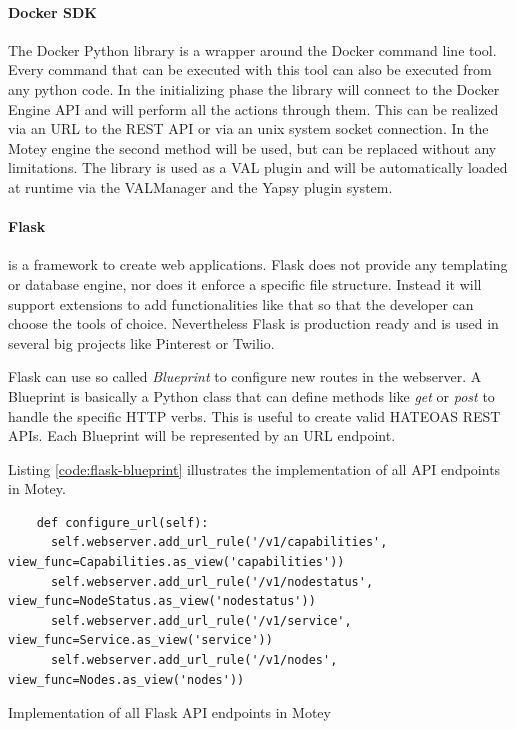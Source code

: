 \paragraph{Docker \ac{SDK}}
The Docker Python library is a wrapper around the Docker command line tool.
Every command that can be executed with this tool can also be executed from any python code.
In the initializing phase the library will connect to the Docker Engine \ac{API} and will perform all the actions through them.
This can be realized via an \ac{URL} to the \ac{REST} \ac{API} or via an unix system socket connection.
In the Motey engine the second method will be used, but can be replaced without any limitations.
The library is used as a \ac{VAL} plugin and will be automatically loaded at runtime via the VALManager and the Yapsy plugin system.

\paragraph{Flask} is a framework to create web applications.
Flask does not provide any templating or database engine, nor does it enforce a specific file structure.
Instead it will support extensions to add functionalities like that so that the developer can choose the tools of choice.\autocite[cf.]{Flask:Documentation:Foreword}
Nevertheless Flask is production ready and is used in several big projects like Pinterest\autocite{Quora:Pinterest:Flask} or Twilio\autocite{Twilio:Flask}.

Flask can use so called \textit{Blueprint} to configure new routes in the webserver.
A Blueprint is basically a Python class that can define methods like \textit{get} or \textit{post} to handle the specific \ac{HTTP} verbs.
This is useful to create valid \ac{HATEOAS} \ac{REST} \acp{API}.
Each Blueprint will be represented by an \ac{URL} endpoint.

Listing \ref{code:flask-blueprint} illustrates the implementation of all \ac{API} endpoints in Motey.
\begin{listing}[H]
  \begin{verbatim}
    def configure_url(self):
      self.webserver.add_url_rule('/v1/capabilities', view_func=Capabilities.as_view('capabilities'))
      self.webserver.add_url_rule('/v1/nodestatus', view_func=NodeStatus.as_view('nodestatus'))
      self.webserver.add_url_rule('/v1/service', view_func=Service.as_view('service'))
      self.webserver.add_url_rule('/v1/nodes', view_func=Nodes.as_view('nodes'))
  \end{verbatim}
  \caption{Implementation of all Flask \ac{API} endpoints in Motey}
  \label{code:flask-blueprint}
\end{listing}

